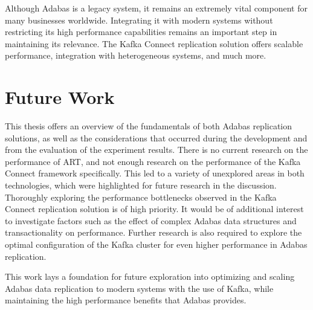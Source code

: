 Although Adabas is a legacy system, it remains an extremely vital component for many businesses worldwide. Integrating it with modern systems without restricting its high performance capabilities remains an important step in maintaining its relevance. The Kafka Connect replication solution offers scalable performance, integration with heterogeneous systems, and much more.

\section{Future Work}
This thesis offers an overview of the fundamentals of both Adabas replication solutions, as well as the considerations that occurred during the development and from the evaluation of the experiment results. There is no current research on the performance of \ac{ART}, and not enough research on the performance of the Kafka Connect framework specifically. This led to a variety of unexplored areas in both technologies, which were highlighted for future research in the discussion. Thoroughly exploring the performance bottlenecks observed in the Kafka Connect replication solution is of high priority. It would be of additional interest to investigate factors such as the effect of complex Adabas data structures and transactionality on performance. Further research is also required to explore the optimal configuration of the Kafka cluster for even higher performance in Adabas replication.

This work lays a foundation for future exploration into optimizing and scaling Adabas data replication to modern systems with the use of Kafka, while maintaining the high performance benefits that Adabas provides.